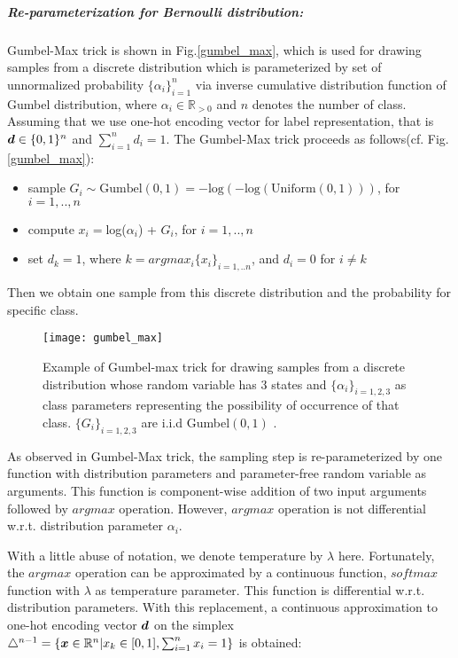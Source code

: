 \subparagraph{Re-parameterization for Bernoulli distribution:}
Gumbel-Max trick\cite{maddison2014sampling} is shown in Fig.\ref{gumbel_max}, which is used for drawing samples from a discrete distribution which is parameterized by set of unnormalized probability $\{\alpha_i\}_{i=1}^{n}$ via inverse cumulative distribution function of Gumbel distribution, where $\alpha_i \in \mathbb R_{>0}$ and $n$ denotes the number of class. Assuming that we use one-hot encoding vector for label representation, that is $\boldsymbol d \in \{0,1\}^n $ and $\sum_{i=1}^{n}d_i = 1$. The Gumbel-Max trick proceeds as follows(cf. Fig.\ref{gumbel_max}):
\begin{itemize}
	\item sample $G_i \sim \text{Gumbel}(0,1) = -\text{log}(-\text{log}(\text{Uniform}(0,1)))$, for $i=1,..,n$
	\item compute $x_i = $log($\alpha_i$) + $G_i$, for $i=1,..,n$
	\item set $d_k = 1$, where $k=argmax_i\{x_i\}_{i=1,..n}$, and $d_i = 0$ for $i \neq k$
\end{itemize}
Then we obtain one sample from this discrete distribution and the probability for specific class.

\begin{figure}[h!]
	\begin{center} \label{gumbel_max}
		\texttt{[image: gumbel\_max]}
		\caption{Example of Gumbel-max trick for drawing samples from a discrete distribution whose random variable has 3 states and $\{\alpha_{i}\}_{i=1,2,3}$ as class parameters representing the possibility of occurrence of that class. $\{G_{i}\}_{i=1,2,3}$ are i.i.d Gumbel$(0,1)$ \cite{maddison2016concrete}.}		
		\label{fig:gumbel_max}
	\end{center}
\end{figure}

As observed in Gumbel-Max trick, the sampling step is re-parameterized by one function with distribution parameters and parameter-free random variable as arguments. This function is component-wise addition of two input arguments followed by $argmax$ operation. However, $argmax$ operation is not differential w.r.t. distribution parameter $\alpha_i$. 

With a little abuse of notation, we denote temperature by $\lambda$ here. Fortunately, the $argmax$ operation can be approximated by a continuous function, $softmax$ function with $\lambda$ as temperature parameter. This function is differential w.r.t. distribution parameters. With this replacement, a continuous approximation to one-hot encoding vector $\boldsymbol d$ on the simplex $\triangle^{n-1} = \{\boldsymbol x \in \mathbb R^n | x_k \in [0,1], \sum_{i=1}^{n} x_i = 1 \}$ is obtained:

